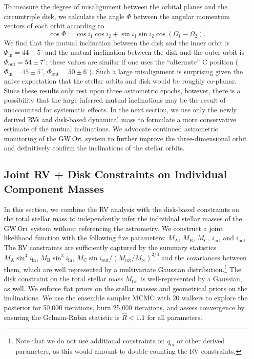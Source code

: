 \documentclass[twocolumn]{aastex61}
\newcommand{\obj}{GW\,Ori}
\begin{document}
To measure the degree of misalignment between the orbital planes and the circumtriple disk, we calculate the angle $\Phi$ between the angular momentum vectors of each orbit according to \citet{fekel81}
\begin{equation}
  \cos \Phi = \cos i_1 \cos i_2 + \sin i_1 \sin i_2 \cos(\Omega_1 - \Omega_2).
\end{equation}
We find that the mutual inclination between the disk and the inner orbit is $\Phi_\mathrm{in} = 44\pm5^\circ$ and the mutual inclination between the disk and the outer orbit is $\Phi_\mathrm{out} = 54\pm 7^\circ$; these values are similar if one uses the ``alternate'' C position ($\Phi_\mathrm{in} = 45 \pm 5^\circ$, $\Phi_\mathrm{out} = 50 \pm 6^\circ$). Such a large misalignment is surprising given the naive expectation that the stellar orbits and disk would be roughly co-planar.  Since these results only rest upon three astrometric epochs, however, there is a possibility that the large inferred mutual inclinations may be the result of unaccounted for systematic effects. In the next section, we use only the newly derived RVs and disk-based dynamical mass to formulate a more conservative estimate of the mutual inclinations. We advocate continued astrometric monitoring of the \obj\ system to further improve the three-dimensional orbit and definitively confirm the inclinations of the stellar orbits.



\subsection{Joint RV + Disk Constraints on Individual Component Masses \label{sec:joint}}

In this section, we combine the RV analysis with the disk-based constraints on the total stellar mass to independently infer the individual stellar masses of the \obj\ system without referencing the \citet{berger11} astrometry. We construct a joint likelihood function with the following five parameters: $M_\mathrm{A}$, $M_\mathrm{B}$, $M_\mathrm{C}$, $i_\mathrm{in}$, and $i_\mathrm{out}$. The RV constraints are sufficiently captured by the summary statistics $M_\mathrm{A} \sin^3 i_\mathrm{in}$, $M_\mathrm{B} \sin^3 i_\mathrm{in}$, $M_\mathrm{C} \sin i_\mathrm{out} / (M_\mathrm{tot} / M_\odot)^{2/3}$ and the covariances between them, which are well represented by a multivariate Gaussian distribution.\footnote{Note that we do not use additional constraints on $q_\mathrm{in}$ or other derived parameters, as this would amount to double-counting the RV constraints.} The disk constraint on the total stellar mass $M_\mathrm{tot}$ is well-represented by a Gaussian, as well. We enforce flat priors on the stellar masses and geometrical priors on the inclinations. We use the ensemble sampler MCMC \citep{goodman10,foreman-mackey13} with 20 walkers to explore the posterior for 50,000 iterations, burn 25,000 iterations, and assess convergence by ensuring the Gelman-Rubin statistic \citep{gelman14} is $\hat{R} < 1.1$ for all parameters.
\end{document}
